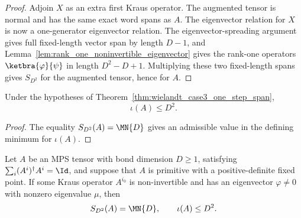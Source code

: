 \begin{proof}
    \leanok
    Adjoin $X$ as an extra first Kraus operator. The augmented tensor is
    normal and has the same exact word spans as $A$. The eigenvector
    relation for $X$ is now a one-generator eigenvector relation. The
    eigenvector-spreading argument gives full fixed-length vector span
    by length $D-1$, and
    Lemma~\ref{lem:rank_one_noninvertible_eigenvector} gives the
    rank-one operators $\ketbra{\varphi}{\psi}$ in length $D^2 - D + 1$.
    Multiplying these two fixed-length spans gives
    $S_{D^2}$ for the augmented tensor, hence for $A$.
\end{proof}

\begin{corollary}%
    \label{cor:wielandt_case3_one_step_index}
    \leanok
    Under the hypotheses of Theorem~\ref{thm:wielandt_case3_one_step_span},
    \[
        \iota(A) \le D^2.
    \]
\end{corollary}

\begin{proof}
    \leanok
    The equality $S_{D^2}(A)=\MN{D}$ gives an admissible value in the
    defining minimum for $\iota(A)$.
\end{proof}

\begin{corollary}%
    \label{cor:wielandt_case3_generator}
    \leanok
    Let $A$ be an MPS tensor with bond dimension $D \ge 1$, satisfying
    $\sum_i (A^i)^\dagger A^i=\Id$, and suppose that $A$ is primitive
    with a positive-definite fixed point. If some Kraus operator $A^{i_0}$
    is non-invertible and has an eigenvector $\varphi \ne 0$ with nonzero
    eigenvalue $\mu$, then
    \[
        S_{D^2}(A)=\MN{D},
        \qquad
        \iota(A) \le D^2.
    \]
\end{corollary}

